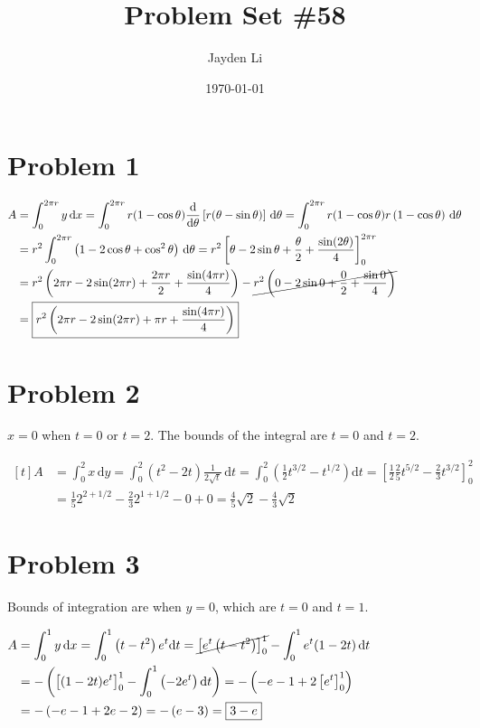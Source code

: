 \documentclass[preview, margin=0.6in]{standalone}
\title{\vspace*{-40pt}Problem Set \#58}
\author{Jayden Li}
\date{\today}
\newcommand*{\problem}[1]{\section*{Problem #1}}
\newcommand*{\deriv}[1][x]{\ensuremath{\dfrac{\mathrm{d}}{\mathrm{d}#1}}}
\begin{document}
\fontsize{12pt}{12pt}\selectfont
\setlength{\abovedisplayskip}{\abovedisplayskip/2}
\setlength{\belowdisplayskip}{\belowdisplayskip/2}
\setlength{\parindent}{0pt}
\setlength{\parskip}{2ex plus 0.5ex minus 0.2ex}
\maketitle

\problem{1}
$\begin{aligned}[t]
    A 
	&=\int_{0}^{2\pi r}y\,\mathrm{d}x
	=\int_{0}^{2\pi r}r(1-\cos \theta) \deriv[\theta]\left[r(\theta-\sin \theta)\right]\,\mathrm{d}\theta
	=\int_{0}^{2\pi r}r(1-\cos\theta)r \left(1-\cos\theta\right)\,\mathrm{d}\theta \\
	&=r^2 \int_{0}^{2\pi r}\left(1-2\cos\theta+\cos^2\theta\right)\,\mathrm{d}\theta
	=r^2 \left[\theta-2\sin \theta+\frac{\theta}{2}+\frac{\sin(2\theta)}{4}\right]_{0}^{2\pi r} \\
	&=r^2 \left(2\pi r-2\sin(2\pi r)+\frac{2\pi r}{2}+\frac{\sin(4\pi r)}{4}\right)-\cancel{r^2 \left(0-2\sin 0+\frac02+\frac{\sin 0}{4}\right)} \\
	&=\boxed{r^2 \left(2\pi r-2\sin(2\pi r)+\pi r+\frac{\sin(4\pi r)}{4}\right)}
\end{aligned}$

\problem{2}
$x=0$ when $t=0$ or $t=2$. The bounds of the integral are $t=0$ and $t=2$.

$\begin{aligned}[t]
	A
	&= \int_{0}^{2}x\,\mathrm{d}y
	=\int_{0}^{2} \left(t^2-2t\right)\frac{1}{2 \sqrt{t}}\,\mathrm{d}t
	=\int_{0}^{2}\left(\frac12 t^{3/2}-t^{1/2}\right)\mathrm{d}t
	=\left[\frac12 \frac 25 t^{5/2}-\frac{2}{3}t^{3/2}\right]_{0}^{2} \\
	&=\frac15 2^{2+1/2}-\frac23 2^{1+1/2}-0+0
	=\frac{4}{5}\sqrt{2}-\frac{4}{3}\sqrt{2}
\end{aligned}$

\problem{3}
Bounds of integration are when $y=0$, which are $t=0$ and $t=1$.

$\begin{aligned}[t]
	A 
	&= \int_{0}^{1}y\,\mathrm{d}x
	=\int_{0}^{1}\left(t-t^2\right)e^t\mathrm{d}t
	=\cancel{\left[e^t \left(t-t^2\right)\right]_{0}^{1}}-\int_{0}^{1}e^t (1-2t)\,\mathrm{d}t \\
	&=-\left(\left[(1-2t)e^t\right]_{0}^{1}-\int_0^1\left(-2e^t\right)\mathrm{d}t\right)
	=-\left(-e-1+2 \left[e^t\right]_{0}^{1}\right) \\
	&=-\left(-e-1+2e-2\right)
	=-\left(e-3\right)
	=\boxed{3-e}
\end{aligned}$
\end{document}
